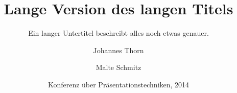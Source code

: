 \documentclass{beamer}
\title[Kurztitel]{%
  Lange Version des langen Titels}
\subtitle{Ein langer Untertitel beschreibt
  alles noch etwas genauer.}
\author[Thorn, Schmitz]{%
  Johannes Thorn \and Malte Schmitz}
\date[KPT 2014]{Konferenz über
  Präsentationstechniken, 2014}
\begin{document}
  \begin{frame}
    \maketitle
  \end{frame}
\end{document}
